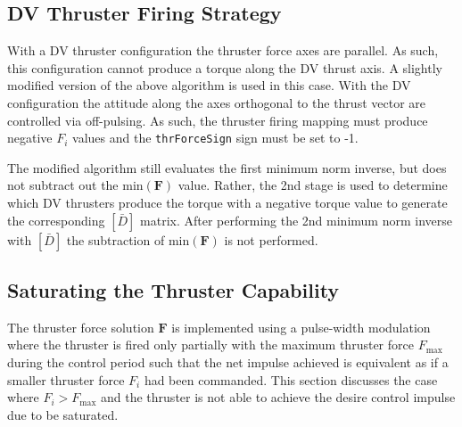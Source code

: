 \subsection{DV Thruster Firing Strategy}
With a DV thruster configuration the thruster force axes are parallel.  As such, this configuration cannot produce a torque along the DV thrust axis.  A slightly modified version of the above algorithm is used in this case.  With the DV configuration the attitude along the axes orthogonal to the thrust vector are controlled via off-pulsing.  As such, the thruster firing mapping must produce negative $F_{i}$ values and the {\tt thrForceSign} sign must be set to -1.  

The modified algorithm still evaluates the first minimum norm inverse, but does not subtract out the $\text{min}(\bm F)$ value.  Rather, the 2nd stage is used to determine which DV thrusters produce the torque with a negative torque value to generate the corresponding $[\bar D]$ matrix.  After performing the 2nd minimum norm inverse with $[\bar D]$ the subtraction of  $\text{min}(\bm F)$ is not performed.  




\subsection{Saturating the Thruster Capability}
The thruster force solution $\bm F$ is implemented using a pulse-width modulation where the thruster is fired only partially with the maximum thruster force $F_{\text{max}}$ during the control period such that the net impulse achieved is equivalent as if a smaller thruster force $F_{i}$ had been commanded.  This section discusses the case where $F_{i}>F_{\text{max}}$ and the thruster is not able to achieve the desire control impulse due to be saturated.  

